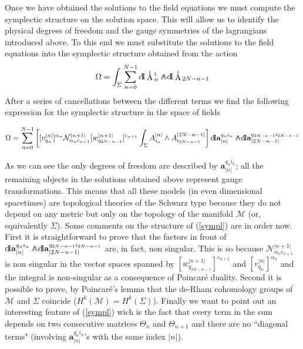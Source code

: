 \documentclass[prd,a4paper,twocolumn,amssymb,amsmath,nofootinbib,showpacs]{revtex4}
\newcommand{\dd}{\textrm{d\!I}}
\newcommand{\ww}{\wedge \kern-.75em \wedge}
\newcommand{\au}{
\begin{picture}(11,3)(-2,-2)
\put(2,5){$\scriptscriptstyle{1}$} \put(0,-3){A}
\end{picture}}
\begin{document}
Once we have obtained the solutions to the field equations we must
compute the symplectic structure on the solution space. This will
allow us to identify the physical degrees of freedom and the gauge
symmetries of the lagrangians introduced above. To this end we
must substitute the solutions to the field equations into the
symplectic structure obtained from the action
\begin{equation}
\Omega=\int_{\Sigma}\sum_{n=0}^{N-1}\dd\au_n^{\rm{t}}\ww\dd\au_{2N-n-1}
\label{omegaeven}
\end{equation} After a series of cancellations between the
different terms we find the following expression for the
symplectic structure in the space of fields
\begin{widetext}
\begin{equation}
\Omega=\sum_{n=0}^{N-1}\left[[v_{q_n}^{|n|}]^{\alpha_n}
\mathcal{N}_{\alpha_nc_{n+1}}^{|n+1|}[w_{q_{2N-n-1}}^{|n+1|}]^{c_{n+1}}
\int_{\Sigma} A_{i_n}^{|n|}\wedge
A_{i_{2N-n-1}}^{|2N-n-1|}\right]\dd \textbf{a}_{|n|}^{q_ni_n}\ww
\dd \textbf{a}_{|2N-n-1|}^{q_{2N-n-1}i_{2N-n-1}} \label{sympl}
\end{equation}
\end{widetext}
As we can see the only degrees of freedom are described by
$\textbf{a}_{|n|}^{q_ni_n}$; all the remaining objects in the
solutions obtained above represent gauge transformations. This
means that all these models (in even dimensional spacetimes) are
topological theories of the Schwarz type because they do not
depend on any metric but only on the topology of the manifold
$\mathcal{M}$ (or, equivalently $\Sigma$). Some comments on the
structure of (\ref{sympl}) are in order now. First it is
straightforward to prove that the factors in front of $\dd
\mathbf{a}_{|n|}^{q_ni_n}\ww \dd
\mathbf{a}_{|2N-n-1|}^{q_{2N-n-1}i_{2N-n-1}}$ are, in fact, non
singular. This is so because $
\mathcal{N}_{\alpha_nc_{n+1}}^{|n+1|}$ is non singular in the
vector spaces spanned by $[w_{q_{2N-n-1}}^{|n+1|}]^{c_{n+1}}$ and
$[v_{q_n}^{|n|}]^{\alpha_n}$ and the integral is non-singular as a
consequence of Poincar\'e duality. Second it is possible to prove,
by Poincar\'e's lemma that the de-Rham cohomology groups of
$\mathcal{M}$ and $\Sigma$ coincide
($H^k(\mathcal{M})=H^k(\Sigma)$). Finally we want to point out an
interesting feature of (\ref{sympl}) wich is the fact that every
term in the sum depends on two consecutive matrices $\Theta_n$ and
$\Theta_{n+1}$ and there are no ``diagonal terms" (involving
$\mathbf{a}_{|n|}^{q_ni_n}$'s with the same index $|n|$).
\end{document}
